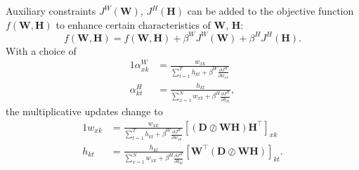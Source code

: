 Auxiliary constraints $J^{W}(\bm{W})$, $J^{H}(\bm{H})$ can be added to the objective function $f(\bm{W,H})$ to enhance certain characteristics of $\bm{W}$, $\bm{H}$:
%
\begin{equation}
	f(\bm{W,H})=f(\bm{W,H})+\beta^{W}J^{W}(\bm{W})+\beta^{H}J^{H}(\bm{H}).
	\label{eq:objective + auxiliary}
\end{equation}
%
With a choice of
%
\begin{alignat}{1}
	\alpha_{xk}^{W} & =\frac{w_{xk}}{\sum_{t=1}^Th_{kt}+\beta^{W}\frac{\partial J^{W}}{\partial w_{xk}}}\nonumber \\
	\alpha_{kt}^{H} & =\frac{h_{kt}}{\sum_{x=1}^Nw_{xk}+\beta^{H}\frac{\partial J^{H}}{\partial h_{kt}}},
	\label{alphas + auxiliary}
\end{alignat}
%
the multiplicative updates change to
%
\begin{alignat}{1}
	w_{xk} & =\frac{w_{xk}}{\sum_{t=1}^Th_{kt}+\beta^{W}\frac{\partial J^{W}}{\partial w_{xk}}}\left[(\bm{D}\oslash\bm{WH})\bm{H^{\top}}\right]_{xk}\nonumber \\
	h_{kt} & =\frac{h_{kt}}{\sum_{x=1}^Nw_{xk}+\beta^{H}\frac{\partial J^{H}}{\partial h_{kt}}}\left[\bm{W^{\top}}(\bm{D}\oslash\bm{WH})\right]_{kt}.
	\label{eq:classic updates + auxiliary}
\end{alignat}